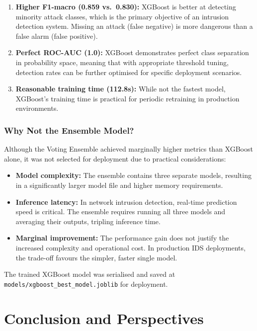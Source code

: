 \documentclass[12pt, a4paper]{article}
\begin{document}
\begin{enumerate}
    \item \textbf{Higher F1-macro (0.859 vs.\ 0.830):} XGBoost is better at detecting minority attack classes, which is the primary objective of an intrusion detection system.
    Missing an attack (false negative) is more dangerous than a false alarm (false positive).

    \item \textbf{Perfect ROC-AUC (1.0):} XGBoost demonstrates perfect class separation in probability space, meaning that with appropriate threshold tuning, detection rates can be further optimised for specific deployment scenarios.

    \item \textbf{Reasonable training time (112.8s):} While not the fastest model, XGBoost's training time is practical for periodic retraining in production environments.
\end{enumerate}

\subsubsection{Why Not the Ensemble Model?}
Although the Voting Ensemble achieved marginally higher metrics than XGBoost alone, it was not selected for deployment due to practical considerations:

\begin{itemize}[nosep]
    \item \textbf{Model complexity:} The ensemble contains three separate models, resulting in a significantly larger model file and higher memory requirements.
    \item \textbf{Inference latency:} In network intrusion detection, real-time prediction speed is critical.
    The ensemble requires running all three models and averaging their outputs, tripling inference time.
    \item \textbf{Marginal improvement:} The performance gain does not justify the increased complexity and operational cost.
    In production IDS deployments, the trade-off favours the simpler, faster single model.
\end{itemize}

The trained XGBoost model was serialised and saved at \texttt{models/xgboost\_best\_model.joblib} for deployment.

\newpage
\section{Conclusion and Perspectives}
\end{document}
